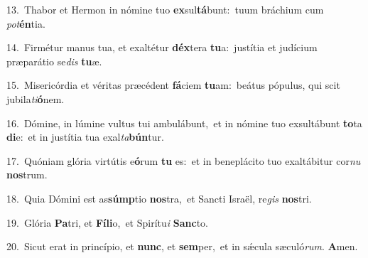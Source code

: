 {\numbfont\textcolor{\numbcolor}{13.}}~Thabor et Hermon in nómine tuo \textbf{ex}\-sul\-\textbf{tá}\-bunt:~\star tuum bráchium cum \textit{pot}\-\textbf{én}tia.\par
{\numbfont\textcolor{\numbcolor}{14.}}~Firmétur manus tua, et exaltétur \textbf{déx}\-tera \textbf{tu}\-a:~\star justítia et judícium præparátio se\textit{dis} \textbf{tu}\-æ.\par
{\numbfont\textcolor{\numbcolor}{15.}}~Misericórdia et véritas præcédent \textbf{fá}\-ciem \textbf{tu}\-am:~\star beátus pópulus, qui scit jubila\-\textit{ti}\-\textbf{ó}nem.\par
{\numbfont\textcolor{\numbcolor}{16.}}~Dómine, in lúmine vultus tui ambulábunt,~\dagger et in nómine tuo exsultábunt \textbf{to}\-ta \textbf{di}\-e:~\star et in justítia tua exal\-\textit{ta}\-\textbf{bún}tur.\par
{\numbfont\textcolor{\numbcolor}{17.}}~Quóniam glória virtútis e\-\textbf{ó}\-rum \textbf{tu} es:~\star et in beneplácito tuo exaltábitur cor\textit{nu} \textbf{nos}\-trum.\par
{\numbfont\textcolor{\numbcolor}{18.}}~Quia Dómini est as\-\textbf{súmp}\-tio \textbf{nos}\-tra,~\star et Sancti Israël, re\textit{gis} \textbf{nos}\-tri.\par
{\numbfont\textcolor{\numbcolor}{19.}}~Glória \textbf{Pa}\-tri, et \textbf{Fí}\-\textbf{li}o,~\star et Spirítu\textit{i} \textbf{Sanc}\-to.\par
{\numbfont\textcolor{\numbcolor}{20.}}~Sicut erat in princípio, et \textbf{nunc}\-, et \textbf{sem}\-per,~\star et in sǽcula sæculó\-\textit{rum}\-. \textbf{A}\-men.\par
